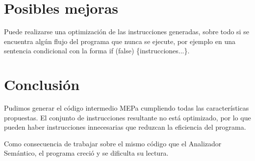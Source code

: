 \section{Posibles mejoras}
Puede realizarse una optimización de las instrucciones generadas, sobre todo si se encuentra algún flujo del programa que nunca se ejecute, por ejemplo en una sentencia condicional con la forma if (false) \{instrucciones...\}.

\section{Conclusión}
Pudimos generar el código intermedio MEPa cumpliendo todas las características propuestas. El conjunto de instrucciones resultante no está optimizado, por lo que pueden haber instrucciones innecesarias que reduzcan la eficiencia del programa.

Como consecuencia de trabajar sobre el mismo código que el Analizador Semántico, el programa creció y se dificulta su lectura.

